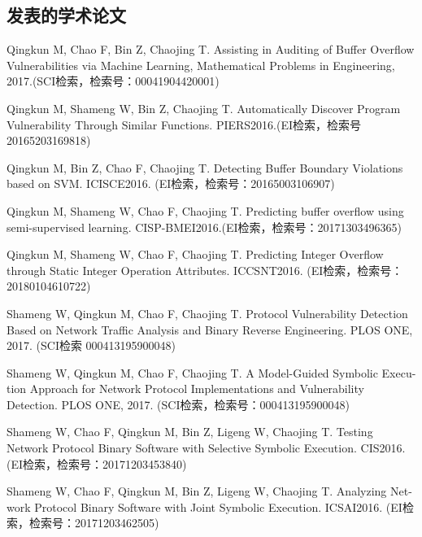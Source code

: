 \begin{resume}

  \section*{发表的学术论文} %
  \begin{enumerate}[{[}1{]}]
  \item Qingkun M, Chao F, Bin Z, Chaojing T. Assisting in Auditing of Buffer Overflow Vulnerabilities via Machine Learning, Mathematical Problems in Engineering, 2017.(SCI检索，检索号：00041904420001)
  
  \item Qingkun M, Shameng W, Bin Z, Chaojing T. Automatically Discover Program Vulnerability Through Similar Functions. PIERS2016.(EI检索，检索号20165203169818)
  
  \item Qingkun M, Bin Z, Chao F, Chaojing T. Detecting Buffer Boundary Violations based on SVM. ICISCE2016. (EI检索，检索号：20165003106907)
  
  \item Qingkun M, Shameng W, Chao F, Chaojing T. Predicting buffer overflow using semi-supervised learning. CISP-BMEI2016.(EI检索，检索号：20171303496365)
  
  \item Qingkun M, Shameng W, Chao F, Chaojing T. Predicting Integer Overflow through Static Integer Operation Attributes. ICCSNT2016. (EI检索，检索号：20180104610722)
  
  \item Shameng W, Qingkun M, Chao F, Chaojing T. Protocol Vulnerability Detection Based on Network Traffic Analysis and Binary Reverse Engineering. PLOS ONE, 2017. (SCI检索 000413195900048)
    
  \item Shameng W, Qingkun M, Chao F, Chaojing T. A Model-Guided Symbolic Execu-
  tion Approach for Network Protocol Implementations and Vulnerability Detection.
  PLOS ONE, 2017. (SCI检索，检索号：000413195900048)
  
  \item Shameng W, Chao F, Qingkun M, Bin Z, Ligeng W, Chaojing T. Testing Network
  Protocol Binary Software with Selective Symbolic Execution. CIS2016. (EI检索，检索号：20171203453840)
  
  \item Shameng W, Chao F, Qingkun M, Bin Z, Ligeng W, Chaojing T. Analyzing Net-
  work Protocol Binary Software with Joint Symbolic Execution. ICSAI2016. (EI检索，检索号：20171203462505)
  

\end{enumerate}
\end{resume}
